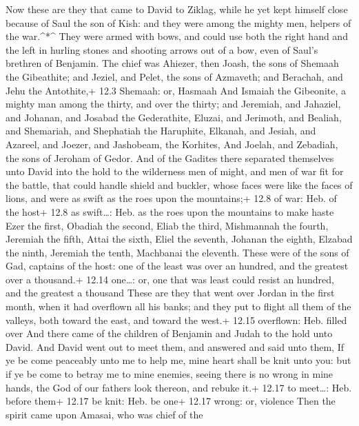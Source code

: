 Now these are they that came to David to Ziklag, while he
yet kept himself close because of Saul the son of Kish: and they were
among the mighty men, helpers of the war.\^{}*\^{}  They
were armed with bows, and could use both the right hand and the left in
hurling stones and shooting arrows out of a bow, even of Saul's brethren
of Benjamin.  The chief was Ahiezer, then Joash, the sons of
Shemaah the Gibeathite; and Jeziel, and Pelet, the sons of Azmaveth; and
Berachah, and Jehu the Antothite,+ 12.3 Shemaah: or, Hasmaah
 And Ismaiah the Gibeonite, a mighty man among the thirty,
and over the thirty; and Jeremiah, and Jahaziel, and Johanan, and
Josabad the Gederathite,  Eluzai, and Jerimoth, and Bealiah,
and Shemariah, and Shephatiah the Haruphite,  Elkanah, and
Jesiah, and Azareel, and Joezer, and Jashobeam, the Korhites,
 And Joelah, and Zebadiah, the sons of Jeroham of Gedor.
 And of the Gadites there separated themselves unto David
into the hold to the wilderness men of might, and men of war fit for the
battle, that could handle shield and buckler, whose faces were like the
faces of lions, and were as swift as the roes upon the mountains;+ 12.8
of war: Heb. of the host+ 12.8 as swift\ldots: Heb. as the roes upon the
mountains to make haste  Ezer the first, Obadiah the second,
Eliab the third,  Mishmannah the fourth, Jeremiah the
fifth,  Attai the sixth, Eliel the seventh, 
Johanan the eighth, Elzabad the ninth,  Jeremiah the tenth,
Machbanai the eleventh.  These were of the sons of Gad,
captains of the host: one of the least was over an hundred, and the
greatest over a thousand.+ 12.14 one\ldots: or, one that was least could
resist an hundred, and the greatest a thousand  These are
they that went over Jordan in the first month, when it had overflown all
his banks; and they put to flight all them of the valleys, both toward
the east, and toward the west.+ 12.15 overflown: Heb. filled over
 And there came of the children of Benjamin and Judah to
the hold unto David.  And David went out to meet them, and
answered and said unto them, If ye be come peaceably unto me to help me,
mine heart shall be knit unto you: but if ye be come to betray me to
mine enemies, seeing there is no wrong in mine hands, the God of our
fathers look thereon, and rebuke it.+ 12.17 to meet\ldots: Heb. before
them+ 12.17 be knit: Heb. be one+ 12.17 wrong: or, violence
 Then the spirit came upon Amasai, who was chief of the
